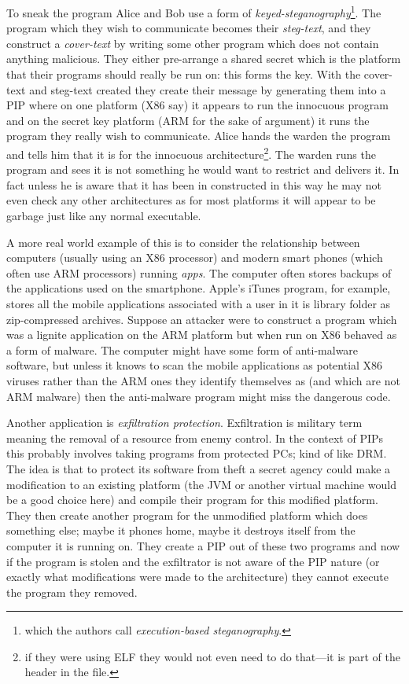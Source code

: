 \documentclass[10pt,]{book}
\begin{document}
To sneak the program Alice and Bob use a form of
\emph{keyed-steganography}\footnote{which the
  authors\autocite{Cha:2010uh} call \emph{execution-based
  steganography}.}. The program which they wish to communicate becomes
their \emph{steg-text}, and they construct a \emph{cover-text} by
writing some other program which does not contain anything malicious.
They either pre-arrange a shared secret which is the platform that their
programs should really be run on: this forms the key. With the
cover-text and steg-text created they create their message by generating
them into a PIP where on one platform (X86 say) it appears to run the
innocuous program and on the secret key platform (ARM for the sake of
argument) it runs the program they really wish to communicate. Alice
hands the warden the program and tells him that it is for the innocuous
architecture\footnote{if they were using ELF they would not even need to
  do that---it is part of the header in the file\autocite{mancx:th}.}.
The warden runs the program and sees it is not something he would want
to restrict and delivers it. In fact unless he is aware that it has been
in constructed in this way he may not even check any other architectures
as for most platforms it will appear to be garbage just like any normal
executable.

A more real world example of this is to consider the relationship
between computers (usually using an X86 processor) and modern smart
phones (which often use ARM processors) running \emph{apps}. The
computer often stores backups of the applications used on the
smartphone. Apple's iTunes program, for example, stores all the mobile
applications associated with a user in it is library folder as
zip-compressed archives. Suppose an attacker were to construct a program
which was a lignite application on the ARM platform but when run on X86
behaved as a form of malware. The computer might have some form of
anti-malware software, but unless it knows to scan the mobile
applications as potential X86 viruses rather than the ARM ones they
identify themselves as (and which are not ARM malware) then the
anti-malware program might miss the dangerous code.

Another application is \emph{exfiltration protection}. Exfiltration is
military term meaning the removal of a resource from enemy control. In
the context of PIPs this probably involves taking programs from
protected PCs; kind of like DRM. The idea is that to protect its
software from theft a secret agency could make a modification to an
existing platform (the JVM or another virtual machine would be a good
choice here) and compile their program for this modified platform. They
then create another program for the unmodified platform which does
something else; maybe it phones home, maybe it destroys itself from the
computer it is running on. They create a PIP out of these two programs
and now if the program is stolen and the exfiltrator is not aware of the
PIP nature (or exactly what modifications were made to the architecture)
they cannot execute the program they removed.
\end{document}
